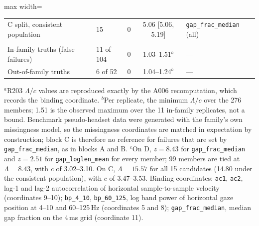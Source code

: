 \begin{table}[ht]
\begin{adjustbox}{max width=\textwidth}
\begin{tabular}{@{}>{\raggedright\arraybackslash}p{5.0cm}lcc>{\raggedright\arraybackslash}p{4.9cm}@{}}
C split, consistent population & 15 & 0 & 5.06 [5.06, 5.19] & \texttt{gap\_frac\_median} (all) \\
\addlinespace
\multicolumn{5}{@{}l}{\textit{C. Benchmark replicates with no admissible member ($A_r = \varnothing$)}} \\
In-family truths (false failures) & 11 of 104 & 0 & 1.03--1.51$^{b}$ & --- \\
Out-of-family truths & 6 of 52 & 0 & 1.04--1.24$^{b}$ & --- \\
\bottomrule
\end{tabular}
\end{adjustbox}

\smallskip
\raggedright\footnotesize
$^{a}$R203 $\Lambda/c$ values are reproduced exactly by the A006 recomputation, which records the binding coordinate. $^{b}$Per replicate, the minimum $\Lambda/c$ over the 276 members; 1.51 is the observed maximum over the 11 in-family replicates, not a bound. Benchmark pseudo-headset data were generated with the family's own missingness model, so the missingness coordinates are matched in expectation by construction; block C is therefore no reference for failures that are set by \texttt{gap\_frac\_median}, as in blocks A and B. $^{c}$On D, $z = 8.43$ for \texttt{gap\_frac\_median} and $z = 2.51$ for \texttt{gap\_loglen\_mean} for every member; 99 members are tied at $\Lambda = 8.43$, with $c$ of 3.02--3.10. On C, $\Lambda = 15.57$ for all 15 candidates (14.80 under the consistent population), with $c$ of 3.47--3.53. Binding coordinates: \texttt{ac1}, \texttt{ac2}, lag-1 and lag-2 autocorrelation of horizontal sample-to-sample velocity (coordinates 9--10); \texttt{bp\_4\_10}, \texttt{bp\_60\_125}, log band power of horizontal gaze position at 4--10 and 60--125\,Hz (coordinates 5 and 8); \texttt{gap\_frac\_median}, median gap fraction on the 4\,ms grid (coordinate 11).
\end{table}
